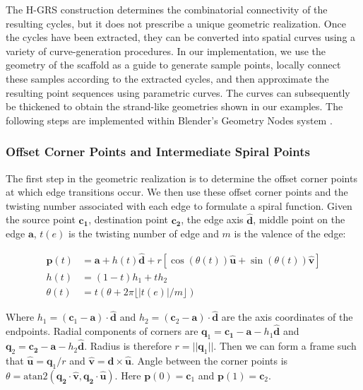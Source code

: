 \documentclass[acmtog]{acmart}
\begin{document}
The H-GRS construction determines the combinatorial connectivity of the
resulting cycles, but it does not prescribe a unique geometric realization.
Once the cycles have been extracted, they can be converted into spatial
curves using a variety of curve-generation procedures. In our implementation,
we use the geometry of the scaffold as a guide to generate sample points,
locally connect these samples according to the extracted cycles, and then
approximate the resulting point sequences using parametric curves. The curves
can subsequently be thickened to obtain the strand-like geometries shown in
our examples. The following steps are implemented within Blender's Geometry Nodes system \cite{blender}.

\subsubsection{Offset Corner Points and Intermediate Spiral Points}

The first step in the geometric realization is to determine the offset corner 
points at which edge transitions occur. 
We then use these offset corner points and the twisting number associated with 
each edge to formulate a spiral function. 
Given the source point $\mathbf{c_1}$, destination point $\mathbf{c_2}$, the edge axis $\hat{\mathbf{d}}$, middle point on the edge $\mathbf{a}$, $t(e)$ is the twisting number of edge and $m$ is the valence of the edge:

\begin{align*}
\mathbf{p}(t) &=
\mathbf{a}
+
h(t)\hat{\mathbf{d}}
+
r\left[
\cos\left(\theta(t)\right)\hat{\mathbf{u}}
+
\sin\left(\theta(t)\right)\hat{\mathbf{v}}
\right]\\
h(t)&=(1-t)h_1+th_2\\
\theta(t)&=t(\theta+2\pi \lfloor |t(e)|/m\rfloor)
\end{align*}

Where $h_1 = (\mathbf{c}_1-\mathbf{a})\cdot\hat{\mathbf{d}}$ and $h_2 = (\mathbf{c}_2-\mathbf{a})\cdot\hat{\mathbf{d}}$ are the axis coordinates of the endpoints.
Radial components of corners are $\mathbf{q}_1=\mathbf{c_1}-\mathbf{a}-h_1\hat{\mathbf{d}}$ and $\mathbf{q}_2=\mathbf{c_2}-\mathbf{a}-h_2\hat{\mathbf{d}}$. 
Radius is therefore $r=||\mathbf{q}_1||$. Then we can form a frame such that $\hat{\mathbf{u}}=\mathbf{q}_1/r$ and $\hat{\mathbf{v}}=\hat{\mathbf{d}}\times\hat{\mathbf{u}}$. 
Angle between the corner points is $\theta=\text{atan2}(\mathbf{q_2}\cdot\hat{\mathbf{v}},\mathbf{q_2}\cdot\hat{\mathbf{u}})$. Here $\mathbf{p}(0)=\mathbf{c}_1$ and $\mathbf{p}(1)=\mathbf{c}_2$.
\end{document}
